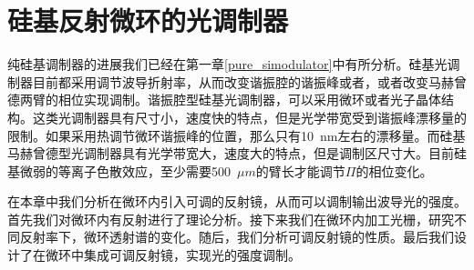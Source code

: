 \chapter{硅基反射微环的光调制器}
纯硅基调制器的进展我们已经在第一章\ref{pure_simodulator}中有所分析。硅基光调制器目前都采用调节波导折射率，从而改变谐振腔的谐振峰或者，或者改变马赫曾德两臂的相位实现调制。谐振腔型硅基光调制器，可以采用微环或者光子晶体结构。这类光调制器具有尺寸小，速度快的特点，但是光学带宽受到谐振峰漂移量的限制。如果采用热调节微环谐振峰的位置，那么只有10~nm左右的漂移量。而硅基马赫曾德型光调制器具有光学带宽大，速度大的特点，但是调制区尺寸大。目前硅基微弱的等离子色散效应，至少需要500~$\mu m$的臂长才能调节$\Pi$的相位变化。

在本章中我们分析在微环内引入可调的反射镜，从而可以调制输出波导光的强度。首先我们对微环内有反射进行了理论分析。接下来我们在微环内加工光栅，研究不同反射率下，微环透射谱的变化。随后，我们分析可调反射镜的性质。最后我们设计了在微环中集成可调反射镜，实现光的强度调制。
